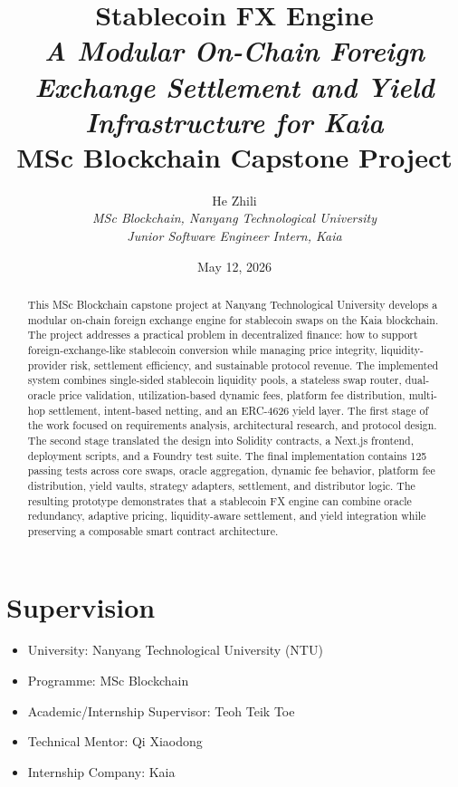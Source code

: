 \documentclass{article}
\title{Stablecoin FX Engine\\
\Large \emph{A Modular On-Chain Foreign Exchange Settlement and Yield Infrastructure for Kaia}\\
\large MSc Blockchain Capstone Project}
\author{He Zhili\\
\emph{MSc Blockchain, Nanyang Technological University}\\
\emph{Junior Software Engineer Intern, Kaia}}
\date{May 12, 2026}
\begin{document}
\maketitle
\thispagestyle{firstpage}

\section*{Supervision}

\begin{itemize}
\renewcommand\labelitemi{--}
\item University: Nanyang Technological University (NTU)
\item Programme: MSc Blockchain
\item Academic/Internship Supervisor: Teoh Teik Toe
\item Technical Mentor: Qi Xiaodong
\item Internship Company: Kaia
\end{itemize}

\begin{abstract}
This MSc Blockchain capstone project at Nanyang Technological University develops a modular on-chain foreign exchange engine for stablecoin swaps on the Kaia blockchain. The project addresses a practical problem in decentralized finance: how to support foreign-exchange-like stablecoin conversion while managing price integrity, liquidity-provider risk, settlement efficiency, and sustainable protocol revenue. The implemented system combines single-sided stablecoin liquidity pools, a stateless swap router, dual-oracle price validation, utilization-based dynamic fees, platform fee distribution, multi-hop settlement, intent-based netting, and an ERC-4626 yield layer. The first stage of the work focused on requirements analysis, architectural research, and protocol design. The second stage translated the design into Solidity contracts, a Next.js frontend, deployment scripts, and a Foundry test suite. The final implementation contains 125 passing tests across core swaps, oracle aggregation, dynamic fee behavior, platform fee distribution, yield vaults, strategy adapters, settlement, and distributor logic. The resulting prototype demonstrates that a stablecoin FX engine can combine oracle redundancy, adaptive pricing, liquidity-aware settlement, and yield integration while preserving a composable smart contract architecture.
\end{abstract}

\newpage
\tableofcontents
\newpage
\listoffigures
\newpage
\listoftables
\newpage
\end{document}
